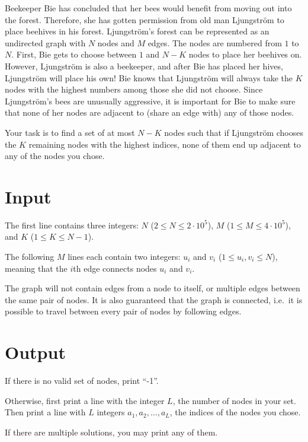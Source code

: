 


Beekeeper Bie has concluded that her bees would benefit from moving out into the forest.
Therefore, she has gotten permission from old man Ljungström to place beehives in his forest.
Ljungström's forest can be represented as an undirected graph with $N$ nodes and $M$ edges.
The nodes are numbered from $1$ to $N$. First, Bie gets to choose between $1$ and $N-K$ nodes
to place her beehives on. However, Ljungström is also a beekeeper, and after Bie has placed her hives, Ljungström will place his own!
Bie knows that Ljungström will always take the $K$ nodes with the highest numbers among those she
did not choose. Since Ljungström's bees are unusually aggressive, it is important for Bie to
make sure that none of her nodes are adjacent to (share an edge with) any of those nodes.

Your task is to find a set of at most $N-K$ nodes such that if Ljungström chooses the
$K$ remaining nodes with the highest indices, none of them end up adjacent to any of the nodes you chose.


\section*{Input}
The first line contains three integers: $N$ ($2 \le N \le 2 \cdot 10^5$),
$M$ ($1 \leq M \leq 4\cdot 10^5$), and $K$ ($1 \leq K \leq N-1$).

The following $M$ lines each contain two integers: $u_i$ and $v_i$ ($1 \leq u_i, v_i \leq N$),
meaning that the $i$th edge connects nodes $u_i$ and $v_i$.

The graph will not contain edges from a node to itself, or multiple edges between the same pair of nodes. It is also guaranteed that the graph is connected, i.e.\ it is possible to travel between every pair of nodes by following edges.

\section*{Output}
If there is no valid set of nodes, print ``-1''.

Otherwise, first print a line with the integer $L$, the number of nodes in your set.
Then print a line with $L$ integers $a_1, a_2, \dots , a_L$, the indices of the nodes
you chose.

If there are multiple solutions, you may print any of them.

